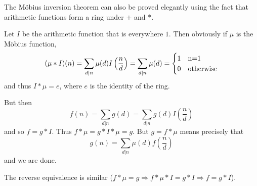 \documentclass[12pt]{article}
\begin{document}
The M\"obius inversion theorem can also be proved elegantly using the fact that arithmetic functions form a ring under $+$ and $*$. 

Let $I$ be the arithmetic function that is everywhere $1$. Then obviously if $\mu$ is the M\"obius function,
\[(\mu *I)(n) = \sum_{d|n}\mu(d)I\left(\frac{n}{d}\right) = \sum_{d|n}\mu(d) = \begin{cases}1&$n=1$\\0&\text{otherwise}\end{cases}\]
and thus $I*\mu=e$, where $e$ is the identity of the ring.

But then
\[f(n)=\sum_{d|n}g(d)=\sum_{d|n}g(d)I\left(\frac{n}{d}\right)\]
and so $f=g*I$. Thus $f*\mu=g*I*\mu=g$. But $g=f*\mu$ means precisely that
\[g(n)=\sum_{d|n}\mu(d)f\left(\frac{n}{d}\right)\]
and we are done.

The reverse equivalence is similar ($f*\mu=g\Rightarrow f*\mu*I=g*I\Rightarrow f=g*I$).
\end{document}
